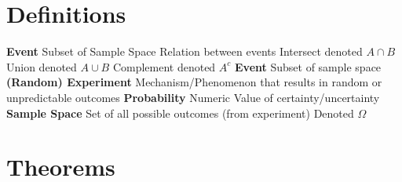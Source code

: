 \documentclass{article}
\begin{document}
\section{Definitions}
\begin{outline}[enumerate]
\1 \textbf{Event}
\2 Subset of Sample Space
\2 Relation between events
\3 Intersect
\4 denoted $A \cap B$
\3 Union
\4 denoted $A \cup B$
\3 Complement
\4 denoted $A^c$
\1 \textbf{Event}
\2 Subset of sample space
\1 \textbf{(Random) Experiment}
\2 Mechanism/Phenomenon that results in random or unpredictable outcomes
\1 \textbf{Probability}
\2 Numeric  Value of certainty/uncertainty
\1 \textbf{Sample Space}
\2 Set of all possible outcomes (from experiment)
\2 Denoted $\Omega$
\end{outline}
\section{Theorems}




\end{document}
